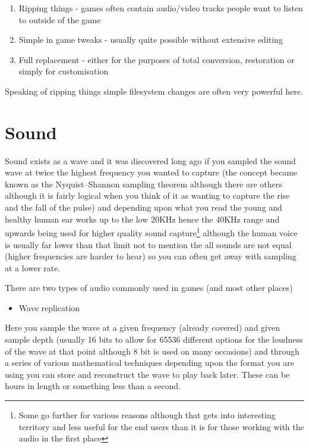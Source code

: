 \documentclass[
]{book}
\providecommand{\tightlist}{%
  \setlength{\itemsep}{0pt}\setlength{\parskip}{0pt}}
\begin{document}
\begin{enumerate}
\def\labelenumi{\arabic{enumi}.}
\tightlist
\item
  Ripping things - games often contain audio/video tracks people want to listen to outside of the game
\item
  Simple in game tweaks - usually quite possible without extensive editing
\item
  Full replacement - either for the purposes of total conversion, restoration or simply for customisation
\end{enumerate}

Speaking of ripping things simple filesystem changes are often very powerful here.

\hypertarget{sound}{%
\section{Sound}\label{sound}}

Sound exists as a wave and it was discovered long ago if you sampled the sound wave at twice the highest frequency you wanted to capture (the concept became known as the Nyquist--Shannon sampling theorem although there are others although it is fairly logical when you think of it as wanting to capture the rise and the fall of the pulse) and depending upon what you read the young and healthy human ear works up to the low 20KHz hence the 40KHz range and upwards being used for higher quality sound capture\footnote{Some go further for various reasons although that gets into interesting territory and less useful for the end users than it is for those working with the audio in the first place} although the human voice is usually far lower than that limit not to mention the all sounds are not equal (higher frequencies are harder to hear) so you can often get away with sampling at a lower rate.

There are two types of audio commonly used in games (and most other places)

\begin{itemize}
\tightlist
\item
  Wave replication
\end{itemize}

Here you sample the wave at a given frequency (already covered) and given sample depth (usually 16 bits to allow for 65536 different options for the loudness of the wave at that point although 8 bit is used on many occasions) and through a series of various mathematical techniques depending upon the format you are using you can store and reconstruct the wave to play back later. These can be hours in length or something less than a second.
\end{document}
